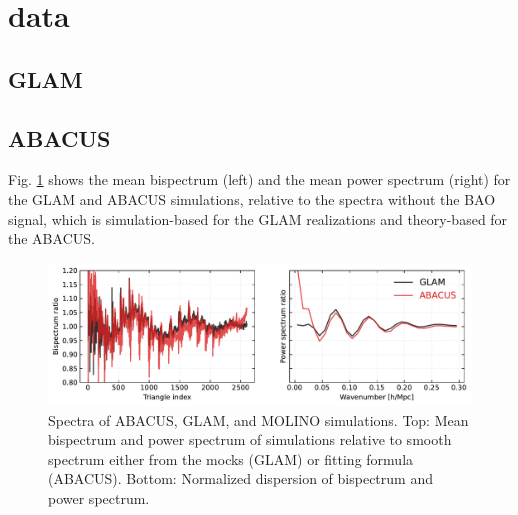 \section{data}\label{sec:data}


\subsection{GLAM}



\subsection{ABACUS}



Fig. \ref{fig:data} shows the mean bispectrum (left) and the mean power spectrum (right) for the GLAM and ABACUS simulations, relative to the spectra without the BAO signal, which is simulation-based for the GLAM realizations and theory-based for the ABACUS.

\begin{figure}
\includegraphics[width=\textwidth]{figures/spectra.pdf}
\caption{Spectra of ABACUS, GLAM, and MOLINO simulations. Top: Mean bispectrum and power spectrum of simulations relative to smooth spectrum either from the mocks (GLAM) or fitting formula (ABACUS). Bottom: Normalized dispersion of bispectrum and power spectrum.}\label{fig:data}
\end{figure}
